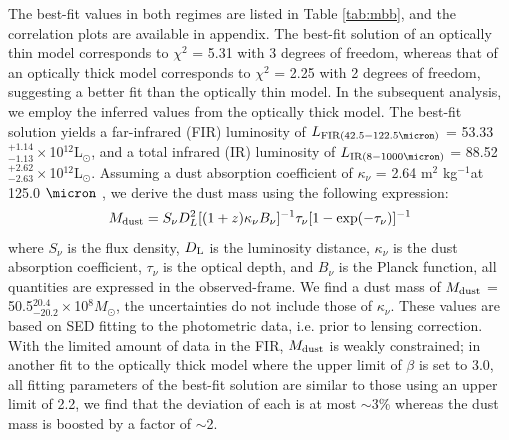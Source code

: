 \documentclass[twocolumn,apj,numberedappendix]{emulateapj}
\newcommand{\Msun}{\mbox{$M_{\odot}$}}
\newcommand{\Lsun}{\mbox{L$_{\odot}$}}
\newcommand{\pmOne}{$^{-1}$}
\begin{document}

The best-fit values in both regimes are listed in Table \ref{tab:mbb}, and the correlation plots are available in appendix. The best-fit solution of an optically thin
model corresponds to $\chi^2$ = 5.31 with 3 degrees of freedom, whereas that of an optically thick model
corresponds to $\chi^2$ = 2.25 with 2 degrees of freedom, suggesting a better fit than the optically thin
model. In the subsequent analysis, we employ the inferred values from the optically thick model.
The best-fit solution yields a far-infrared (FIR) luminosity of $L_{\rm FIR (42.5-122.5\micron)}$ = 53.33$^{+1.14}_{-1.13}\times$10$^{12}$\Lsun, and a total infrared (IR) luminosity of $L_{\rm IR (8-1000 \micron)}$ = 88.52$^{+2.62}_{-2.63}\times$10$
^{12}$\Lsun. Assuming a dust absorption coefficient of $\kappa_{\nu}$ = 2.64 m$^2$ kg\pmOne at 125.0 $
\micron$ \citep{Dunne03a}, we derive the dust mass using the following expression:
\begin{equation}
M_{\rm dust} = S_{\nu} D_{L}^2 [(1 + z) \kappa_{\nu} B_{\nu}]^{-1} \tau_{\nu} [1-
\exp(-\tau_{\nu})]^{-1}
\end{equation}
where $S_{\nu}$ is the flux density, $D_{\rm L}$ is the luminosity distance, $\kappa_{\nu}$ is the dust
absorption coefficient, $\tau_{\nu}$ is the optical depth, and $B_{\nu}$ is the Planck function,
all quantities are expressed in the observed-frame. We find a dust mass of $M_{\rm dust}$ =
50.5$^{20.4}_{-20.2}\times$10$^8$\Msun, the uncertainties do not include those of $\kappa_{\nu}$. These values are based on SED fitting to the photometric data, i.e. prior
to lensing correction. With the limited amount of data in the FIR, $M_{\rm dust}$ is weakly constrained; in another fit to the optically thick model where the upper limit of $\beta$ is set to 3.0, all fitting parameters of the best-fit solution are similar to those using an upper limit of 2.2, we find that the deviation of each is at most $\sim$3\% whereas the dust mass is boosted by a factor of $\sim$2. 
\end{document}
